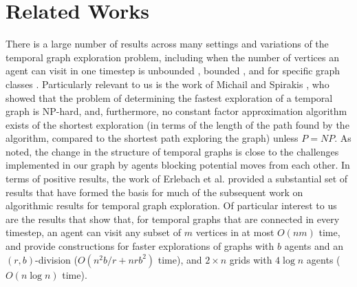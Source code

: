 \section{Related Works}
There is a large number of results across many settings and variations of the temporal graph exploration problem, including when the number of vertices an agent can visit in one timestep is unbounded \cite{arrighi2023kernelizing,erlebach2022parameterized}, bounded \cite{erlebach_et_al:LIPIcs.ICALP.2019.141,erlebach2021temporal,michail2016traveling}, and for specific graph classes \cite{adamson2022faster,akrida2021temporal,bodlaender2019exploring,bumpus2023edge,deligkas2022optimizing,erlebach2022exploration,erlebach2018faster,taghian2020exploring}.
Particularly relevant to us is the work of Michail and Spirakis \cite{michail2016traveling}, who showed that the problem of determining the fastest exploration of a temporal graph is NP-hard, and, furthermore, no constant factor approximation algorithm exists of the shortest exploration (in terms of the length of the path found by the algorithm, compared to the shortest path exploring the graph) unless $P = NP$. As noted, the change in the structure of temporal graphs is close to the challenges implemented in our graph by agents blocking potential moves from each other.
In terms of positive results, the work of Erlebach et al. \cite{erlebach2021temporal} provided a substantial set of results that have formed the basis for much of the subsequent work on algorithmic results for temporal graph exploration. Of particular interest to us are the results that show that, for temporal graphs that are connected in every timestep, an agent can visit any subset of $m$ vertices in at most $O(n m)$ time, and provide constructions for faster explorations of graphs with $b$ agents and an $(r, b)$-division ($O(n^2 b / r + n r b^2)$ time), and $2 \times n$ grids with $4 \log n$ agents ($O(n \log n)$ time).